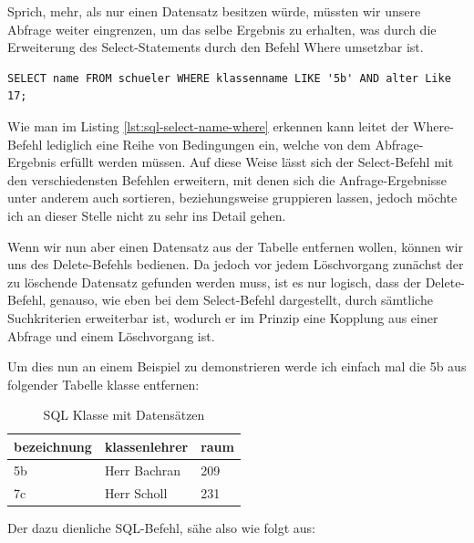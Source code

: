 \documentclass[12pt,a4paper,bibliography=totocnumbered,listof=totocnumbered]{scrartcl}
\begin{document}
Sprich, mehr, als nur einen Datensatz besitzen würde, müssten wir unsere Abfrage weiter eingrenzen, um das selbe Ergebnis zu erhalten, was durch die Erweiterung des \glqq Select-Statements\grqq{} durch den Befehl \glqq Where\grqq{} umsetzbar ist.


\vspace{1em}
\begin{lstlisting}[caption= SQL Select Name + Where, label=lst:sql-select-name-where]
SELECT name FROM schueler WHERE klassenname LIKE '5b' AND alter Like 17;
\end{lstlisting}

Wie man im Listing \ref{lst:sql-select-name-where} erkennen kann leitet der \glqq Where-Befehl\grqq{} lediglich eine Reihe von Bedingungen ein, welche von dem Abfrage-Ergebnis erfüllt werden müssen.
Auf diese Weise lässt sich der \glqq Select-Befehl\grqq{} mit den verschiedensten Befehlen erweitern, mit denen sich die Anfrage-Ergebnisse unter anderem auch sortieren, beziehungsweise gruppieren lassen, jedoch möchte ich an dieser Stelle nicht zu sehr ins Detail gehen.

Wenn wir nun aber einen Datensatz aus der Tabelle entfernen wollen, können wir uns des  \glqq Delete-Befehls\grqq{} bedienen.
Da jedoch vor jedem Löschvorgang zunächst der zu löschende Datensatz gefunden werden muss, ist es nur logisch, dass der  \glqq Delete-Befehl\grqq{}, genauso, wie eben bei dem  \glqq Select-Befehl\grqq{} dargestellt, durch sämtliche Suchkriterien erweiterbar ist, wodurch er im Prinzip eine Kopplung aus einer Abfrage und einem Löschvorgang ist.

Um dies nun an einem Beispiel zu demonstrieren werde ich einfach mal die \glqq 5b\grqq{} aus folgender Tabelle \glqq klasse\grqq{} entfernen:\\
\vspace{1em}
\begin{table}[!h]
	\centering
	\begin{tabular}{|l|l|l|}
		\hline
		\textbf{bezeichnung} & \textbf{klassenlehrer} & \textbf{raum}\\
		\hline
		5b & Herr Bachran & 209\\
		\hline
		7c & Herr Scholl & 231\\
		
	\end{tabular}
	\caption{SQL Klasse mit Datensätzen}
	\label{tab:sql-klasse2}
\end{table}

Der dazu dienliche SQL-Befehl, sähe also wie folgt aus:
\end{document}
